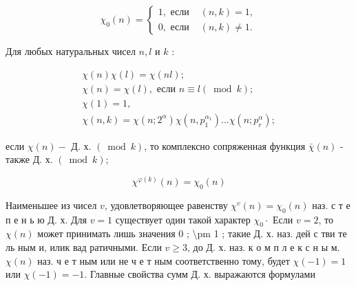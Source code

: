 \documentclass[10pt]{article}
\begin{document}
\[

\chi_{0}(n)= \begin{cases}1, \text { если } & (n, k)=1, \\ 0, \text { если } & (n, k) \neq 1 .\end{cases}

\]



Для любых натуральных чисел $n, l$ и $k$ :



\[

\begin{gathered}

\chi(n) \chi(l)=\chi(n l) ; \\

\chi(n)=\chi(l), \text { если } n \equiv l(\bmod k) ; \\

\chi(1)=1, \\

\chi(n, k)=\chi\left(n ; 2^{\alpha}\right) \chi\left(n, p_{1}^{\alpha_{1}}\right) \ldots \chi\left(n ; p_{r}^{\alpha}\right) ;

\end{gathered}

\]



если $\chi(n)-$ Д. х. $(\bmod k)$, то комплексно сопряженная функция $\bar{\chi}(n)$ - также Д. х. $(\bmod k)$;



\[

\chi^{\varphi(k)}(n)=\chi_{0}(n)

\]



Наименьшее из чисел $v$, удовлетворяющее равенству $\chi^{v}(n)=\chi_{0}(n)$ наз. с т е п е н ь ю Д. х. Для $v=1$ существует один такой характер $\chi_{0} \cdot$ Если $v=2$, то $\chi(n)$ может принимать лишь значения 0 ; \textbackslash pm 1 ; такие Д. х. наз. дей с тви те ль ным и, илик вад ратичными. Если $v \geqslant 3$, до Д. х. наз. к о м п л е к с н ы м. $\chi(n)$ наз. ч е т ным или не ч е т ным соответственно тому, будет $\chi(-1)=1$ или $\chi(-1)=-1$. Главные свойства сумм Д. х. выражаются формулами
\end{document}
